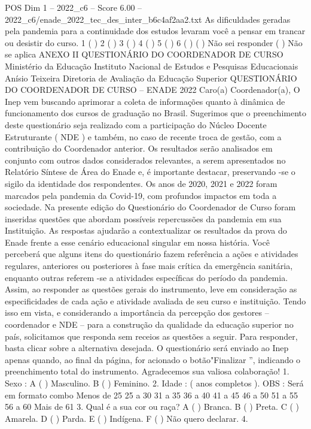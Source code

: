 \begin{textsample}{POS Dim 1 – 2022\_c6 – Score 6.00 – 2022\_c6/enade\_2022\_tec\_des\_inter\_b6c4af2aa2.txt}
As dificuldades geradas pela pandemia para a continuidade dos estudos levaram você a pensar em trancar ou desistir do curso. 1 ( ) 2 ( ) 3 ( ) 4 ( ) 5 ( ) 6 ( ) ( ) Não sei responder ( ) Não se aplica ANEXO II QUESTIONÁRIO DO COORDENADOR DE CURSO Ministério da Educação Instituto Nacional de Estudos e Pesquisas Educacionais Anísio Teixeira Diretoria de Avaliação da Educação Superior QUESTIONÁRIO DO COORDENADOR DE CURSO – ENADE 2022 Caro(a) Coordenador(a), O Inep vem buscando aprimorar a coleta de informações quanto à dinâmica de funcionamento dos cursos de graduação no Brasil.
Sugerimos que o preenchimento deste questionário seja realizado com a participação do Núcleo Docente Estruturante ( NDE ) e também, no caso de recente troca de gestão, com a contribuição do Coordenador anterior.
Os resultados serão analisados em conjunto com outros dados considerados relevantes, a serem apresentados no Relatório Síntese de Área do Enade e, é importante destacar, preservando -se o sigilo da identidade dos respondentes.
Os anos de 2020, 2021 e 2022 foram marcados pela pandemia da Covid-19, com profundos impactos em toda a sociedade.
Na presente edição do Questionário do Coordenador de Curso foram inseridas questões que abordam possíveis repercussões da pandemia em sua Instituição.
As respostas ajudarão a contextualizar os resultados da prova do Enade frente a esse cenário educacional singular em nossa história.
Você perceberá que alguns itens do questionário fazem referência a ações e atividades regulares, anteriores ou posteriores à fase mais crítica da emergência sanitária, enquanto outras referem -se a atividades específicas do período da pandemia.
Assim, ao responder as questões gerais do instrumento, leve em consideração as especificidades de cada ação e atividade avaliada de seu curso e instituição.
Tendo isso em vista, e considerando a importância da percepção dos gestores – coordenador e NDE – para a construção da qualidade da educação superior no país, solicitamos que responda sem receios as questões a seguir.
Para responder, basta clicar sobre a alternativa desejada.
O questionário será enviado ao Inep apenas quando, ao final da página, for acionado o botão"Finalizar ”, indicando o preenchimento total do instrumento.
Agradecemos sua valiosa colaboração! 1.
Sexo : A ( ) Masculino.
B ( ) Feminino. 2.
Idade : ( anos completos ).
OBS : Será em formato combo Menos de 25 25 a 30 31 a 35 36 a 40 41 a 45 46 a 50 51 a 55 56 a 60 Mais de 61 3.
Qual é a sua cor ou raça?
A ( ) Branca.
B ( ) Preta.
C ( ) Amarela.
D ( ) Parda.
E ( ) Indígena.
F ( ) Não quero declarar. 4.

\end{textsample}
